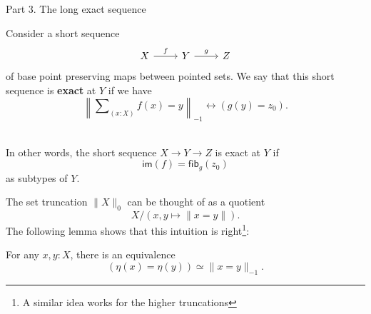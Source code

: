 \documentclass[handout]{beamer}
\newcommand{\brck}[1]{\|#1\|}
\newcommand{\trunc}[2]{\|#2\|_{#1}}
\newcommand{\fib}{\mathsf{fib}}
\newcommand{\im}{\mathsf{im}}
\begin{document}
\begin{frame}
  \huge{Part 3. The long exact sequence}
\end{frame}

\begin{frame}
  \begin{definition}
    Consider a short sequence
    \begin{equation*}
      \begin{tikzcd}[ampersand replacement=\&]
        X \arrow[r,"f"] \& Y \arrow[r,"g"] \& Z
      \end{tikzcd}
    \end{equation*}
    of base point preserving maps between pointed sets. We say that this short sequence is \textbf{exact} at $Y$ if we have
    \begin{equation*}
      \left\|\sum\nolimits_{(x:X)}f(x)=y\right\|_{-1}\leftrightarrow (g(y)=z_0).
    \end{equation*}\\[\baselineskip]\pause

    In other words, the short sequence $X\to Y\to Z$ is exact at $Y$ if
    \begin{equation*}
      \im(f)=\fib_{g}(z_0)
    \end{equation*}
    as subtypes of $Y$. 
  \end{definition}
\end{frame}

\begin{frame}
  The set truncation $\trunc{0}{X}$ can be thought of as a quotient
  \begin{equation*}
    X/(x,y\mapsto\brck{x=y}).
  \end{equation*}
  The following lemma shows that this intuition is right\footnote{A similar idea works for the higher truncations}:\\[\baselineskip]
  \begin{lemma}
    For any $x,y:X$, there is an equivalence
    \begin{equation*}
      (\eta(x)=\eta(y))\simeq \trunc{-1}{x=y}.
    \end{equation*}
  \end{lemma}
\end{frame}
\end{document}
